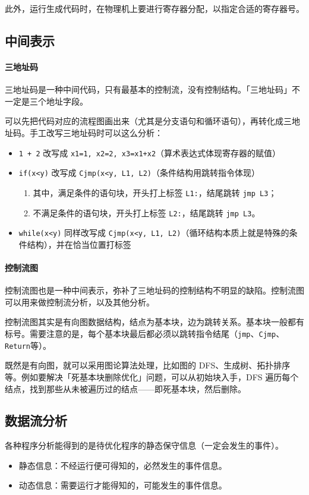 \documentclass[UTF8]{ctexart}
\newcommand\Emph[1]{\textcolor{cyan!80!black}{#1}}
\begin{document}
此外，运行生成代码时，在物理机上要进行寄存器分配，以指定合适的寄存器号。

\subsection{中间表示}
\paragraph{三地址码}

\Emph{三地址码}是一种中间代码，只有最基本的控制流，没有控制结构。「三地址码」不一定是三个地址字段。

可以先把代码对应的流程图画出来（尤其是分支语句和循环语句），再转化成三地址码。手工改写三地址码时可以这么分析：
\begin{itemize}[leftmargin=1.5cm]
  \item \verb!1 + 2! 改写成 \verb!x1=1, x2=2, x3=x1+x2!（算术表达式体现寄存器的赋值）
  \item \verb!if(x<y)! 改写成 \verb!Cjmp(x<y, L1, L2)!（条件结构用跳转指令体现）
  \begin{enumerate}[itemsep=0pt,parsep=0pt]
    \item 其中，满足条件的语句块，开头打上标签 \verb!L1:!，结尾跳转 \verb!jmp L3!；
    \item 不满足条件的语句块，开头打上标签 \verb!L2:!，结尾跳转 \verb!jmp L3!。
  \end{enumerate}
  \item \verb!while(x<y)! 同样改写成 \verb!Cjmp(x<y, L1, L2)!（循环结构本质上就是特殊的条件结构），并在恰当位置打标签
\end{itemize}

\paragraph{控制流图}
\Emph{控制流图}也是一种中间表示，弥补了三地址码的控制结构不明显的缺陷。控制流图可以用来做控制流分析，以及其他分析。

控制流图其实是有向图数据结构，结点为基本块，边为跳转关系。基本块一般都有标号。需要注意的是，每个基本块最后都必须以\Emph{跳转指令结尾}（\verb!jmp!、\verb!Cjmp!、\verb!Return!等）。

既然是有向图，就可以采用图论算法处理，比如图的 DFS、生成树、拓扑排序等。例如要解决「死基本块删除优化」问题，可以从初始块入手，DFS 遍历每个结点，找到那些从未被遍历过的结点——即死基本块，然后删除。

\subsection{数据流分析}
各种程序分析能得到的是待优化程序的\Emph{静态保守信息}（一定会发生的事件）。
\begin{itemize}[itemsep=0pt,parsep=0pt,leftmargin=1.5cm]
  \item 静态信息：不经运行便可得知的，必然发生的事件信息。
  \item 动态信息：需要运行才能得知的，可能发生的事件信息。
\end{itemize}
\end{document}
